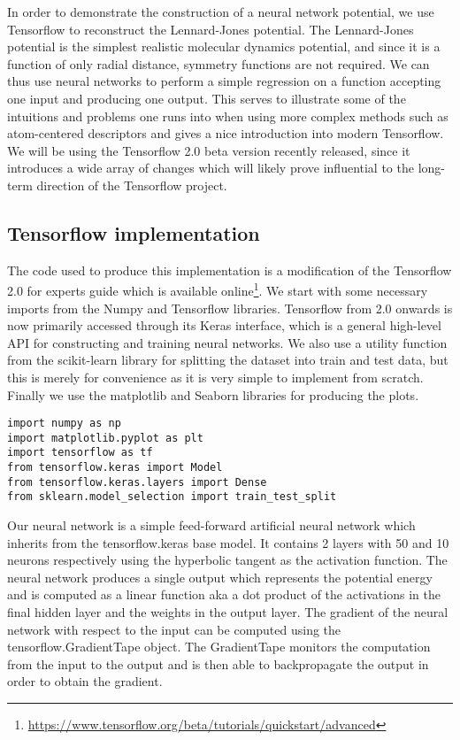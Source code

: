 In order to demonstrate the construction of a neural network
potential, we use Tensorflow to reconstruct the Lennard-Jones
potential. The Lennard-Jones potential is the simplest
realistic molecular dynamics potential, and since it is a function
of only radial distance, symmetry functions are not required.
We can thus use neural networks to perform a simple regression
on a function accepting one input and producing one output.
This serves to illustrate some of the intuitions and problems
one runs into when using more complex methods such as 
atom-centered descriptors and gives a nice introduction into
modern Tensorflow. We will be using the Tensorflow 2.0
beta version recently released, since it introduces a wide array
of changes which will likely prove influential to the long-term
direction of the Tensorflow project.

\subsection{Tensorflow implementation}
The code used to produce this implementation is
a modification of the Tensorflow 2.0 for experts guide
which is available online\footnote{\url{
https://www.tensorflow.org/beta/tutorials/quickstart/advanced}}.
We start with some necessary imports from the Numpy and Tensorflow
libraries. Tensorflow from 2.0 onwards is now primarily accessed through
its Keras interface, which is a general high-level API for
constructing and training neural networks.
We also use a utility function from the scikit-learn library
for splitting the dataset into train and test data, but this is
merely for convenience as it is very simple to implement from scratch.
Finally we use the matplotlib and Seaborn libraries for
producing the plots.

\begin{verbatim}
import numpy as np
import matplotlib.pyplot as plt
import tensorflow as tf
from tensorflow.keras import Model
from tensorflow.keras.layers import Dense
from sklearn.model_selection import train_test_split
\end{verbatim}

Our neural network is a simple feed-forward artificial neural network
which inherits from the tensorflow.keras base model.
It contains 2 layers with 50 and 10 neurons respectively
using the hyperbolic tangent as the activation function.
The neural network produces a single output which represents
the potential energy and is computed as a linear function
aka a dot product of the activations in the final hidden layer
and the weights in the output layer.
The gradient of the neural network with respect to the input
can be computed using the tensorflow.GradientTape object.
The GradientTape monitors the computation from the input to the output
and is then able to backpropagate the output in order to obtain
the gradient.


